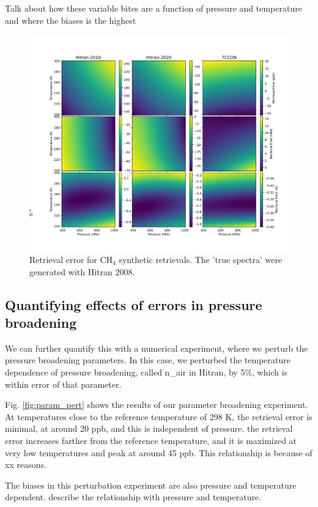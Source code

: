\documentclass[amt, manuscript]{copernicus}
\begin{document}
Talk about how these variable bites are a function of pressure and temperature and where the biases is the highest

\begin{figure}
  \centering
  \includegraphics{heatmap_ch4.pdf}
  \caption{Retrieval error for CH$_4$ synthetic retrievals. The 'true spectra' were generated with Hitran 2008.}
  \label{fig:ch4_synthetic_retrieval}
\end{figure}

\subsection{Quantifying effects of errors in pressure broadening}
We can further quantify this with a numerical experiment, where we perturb the pressure broadening parameters. In this case, we perturbed the temperature dependence of pressure broadening, called n\_air in Hitran,  by 5\%, which is within error of that parameter.

Fig. \ref{fig:param_pert} shows the results of our parameter broadening experiment. At temperatures close to the reference temperature of 298 K, the retrieval error is minimal, at around 20 ppb, and this is independent of pressure. the retrieval error increases farther from the reference temperature, and it is maximized at very low temperatures and peak at around 45 ppb. This relationship is because of xx reasons. 

The biases in this perturbation experiment are also pressure and temperature dependent. describe the relationship with pressure and temperature. 
\end{document}
